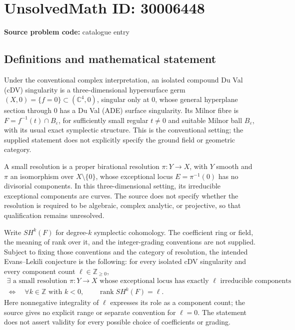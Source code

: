 \documentclass[11pt]{article}
\newcommand{\Z}{\mathbb{Z}}
\newcommand{\C}{\mathbb{C}}
\begin{document}
\section*{UnsolvedMath ID: 30006448}
\textbf{Source problem code:} catalogue entry
\subsection{Definitions and mathematical statement}
Under the conventional complex interpretation, an isolated compound Du Val (cDV) singularity is a three-dimensional hypersurface germ \((X,0)=\{f=0\}\subset(\C^4,0)\), singular only at \(0\), whose general hyperplane section through \(0\) has a Du Val (ADE) surface singularity. Its Milnor fibre is \(F=f^{-1}(t)\cap B_\varepsilon\), for sufficiently small regular \(t\ne0\) and suitable Milnor ball \(B_\varepsilon\), with its usual exact symplectic structure. This is the conventional setting; the supplied statement does not explicitly specify the ground field or geometric category.

A small resolution is a proper birational resolution \(\pi:Y\to X\), with \(Y\) smooth and \(\pi\) an isomorphism over \(X\setminus\{0\}\), whose exceptional locus \(E=\pi^{-1}(0)\) has no divisorial components. In this three-dimensional setting, its irreducible exceptional components are curves. The source does not specify whether the resolution is required to be algebraic, complex analytic, or projective, so that qualification remains unresolved.

Write \(SH^k(F)\) for degree-\(k\) symplectic cohomology. The coefficient ring or field, the meaning of rank over it, and the integer-grading conventions are not supplied. Subject to fixing those conventions and the category of resolution, the intended Evans--Lekili conjecture is the following: for every isolated cDV singularity and every component count \(\ell\in\Z_{\ge0}\),
\[
\begin{gathered}
\exists\text{ a small resolution }\pi:Y\to X
\text{ whose exceptional locus has exactly }\ell
\text{ irreducible components}
\\[2pt]
\Longleftrightarrow
\quad
\forall k\in\Z\text{ with }k<0,\qquad
\operatorname{rank}SH^k(F)=\ell.
\end{gathered}
\]
Here nonnegative integrality of \(\ell\) expresses its role as a component count; the source gives no explicit range or separate convention for \(\ell=0\). The statement does not assert validity for every possible choice of coefficients or grading.
\end{document}
